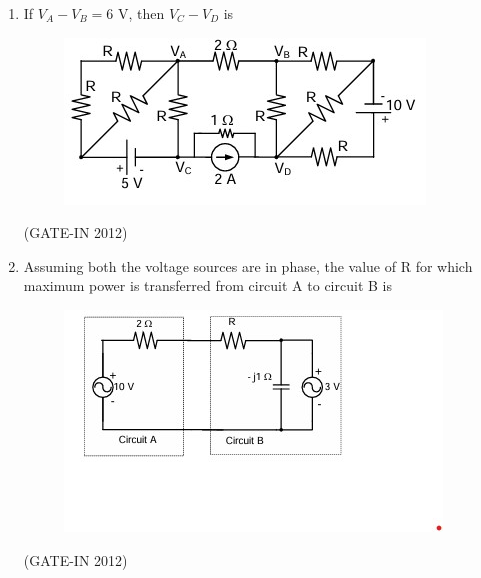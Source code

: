 \documentclass[journal,12pt,onecolumn]{IEEEtran}
\theoremstyle{remark}
\begin{document}
\begin{enumerate}
\item If $V_A - V_B = 6$ V, then $V_C - V_D$ is
\begin{figure}[H]
    \centering
    \includegraphics[width=0.5\columnwidth]{figs/a11.jpg}
    \caption*{}
    \label{fig:a11}
\end{figure}

\hfill{(GATE-IN 2012)}
\begin{enumerate}
\end{enumerate}

\item Assuming both the voltage sources are in phase, the value of R for which maximum power is transferred from circuit A to circuit B is
\begin{figure}[H]
    \centering
    \includegraphics[width=0.7\columnwidth]{figs/a12.jpg}
    \caption*{}
    \label{fig:a12}
\end{figure}

\hfill{(GATE-IN 2012)}
\begin{enumerate}
\end{enumerate}


\end{enumerate}
\end{document}
